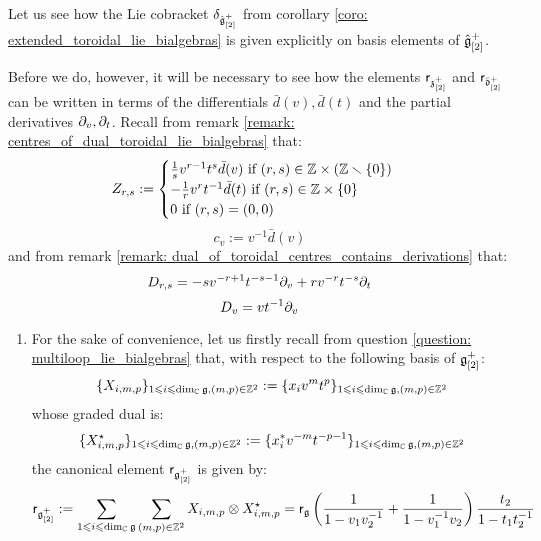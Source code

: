             \begin{remark} \label{remark: extended_toroidal_lie_bialgebras_explicit_formulae}
                Let us see how the Lie cobracket $\delta_{\hat{\mathfrak{g}}_{[2]}^+}$ from corollary \ref{coro: extended_toroidal_lie_bialgebras} is given explicitly on basis elements of $\hat{\mathfrak{g}}_{[2]}^+$.

                Before we do, however, it will be necessary to see how the elements $\mathsf{r}_{\mathfrak{z}_{[2]}^+}$ and $\mathsf{r}_{\bar{\mathfrak{d}}_{[2]}^+}$ can be written in terms of the differentials $\bar{d}(v), \bar{d}(t)$ and the partial derivatives $\partial_v, \partial_t$. Recall from remark \ref{remark: centres_of_dual_toroidal_lie_bialgebras} that:
                    $$
                        Z_{r, s} :=
                        \begin{cases}
                            \text{$\frac1s v^{r - 1} t^s \bar{d}(v)$ if $(r, s) \in \Z \x (\Z \setminus \{0\})$}
                            \\
                            \text{$-\frac1r v^r t^{-1} \bar{d}(t)$ if $(r, s) \in \Z \x \{0\}$}
                            \\
                            \text{$0$ if $(r, s) = (0, 0)$}
                        \end{cases}
                    $$
                    $$c_v := v^{-1} \bar{d}(v)$$
                and from remark \ref{remark: dual_of_toroidal_centres_contains_derivations} that:
                    $$D_{r, s} = -s v^{-r + 1} t^{-s - 1} \partial_v + r v^{-r} t^{-s} \partial_t$$
                    $$D_v = v t^{-1} \partial_v$$
                \begin{enumerate}
                    \item For the sake of convenience, let us firstly recall from question \ref{question: multiloop_lie_bialgebras} that, with respect to the following basis of $\mathfrak{g}_{[2]}^+$:
                        $$\{X_{i, m, p}\}_{1 \leqslant i \leqslant \dim_{\mathbb{C}} \mathfrak{g}, (m, p) \in \mathbb{Z}^2} := \{x_i v^m t^p\}_{1 \leqslant i \leqslant \dim_{\mathbb{C}} \mathfrak{g}, (m, p) \in \mathbb{Z}^2}$$
                    whose graded dual is:
                        $$\{X_{i, m, p}^{\star}\}_{1 \leqslant i \leqslant \dim_{\mathbb{C}} \mathfrak{g}, (m, p) \in \mathbb{Z}^2} := \{x_i^* v^{-m} t^{-p - 1}\}_{1 \leqslant i \leqslant \dim_{\mathbb{C}} \mathfrak{g}, (m, p) \in \mathbb{Z}^2}$$
                    the canonical element $\mathsf{r}_{\mathfrak{g}_{[2]}^+}$ is given by:
                        $$\sfr_{\g_{[2]}^+} := \sum_{1 \leq i \leq \dim_{\bbC} \g} \sum_{(m, p) \in \Z^2} X_{i, m, p} \tensor X_{i, m, p}^{\star} = \sfr_{\g} \left( \frac{1}{1 - v_1 v_2^{-1}} + \frac{1}{1 - v_1^{-1} v_2} \right) \frac{t_2}{1 - t_1 t_2^{-1}}$$

\end{enumerate}
\end{remark}
